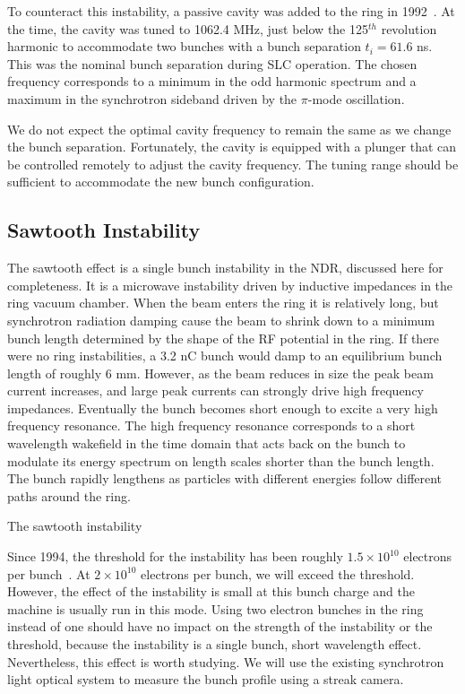 \documentclass[aps,prl,preprint,groupedaddress]{revtex4-1}
\begin{document}
To counteract this instability, a passive cavity was added to the ring in 1992~\cite{pi-cav}. At the time, the cavity was tuned to 1062.4 MHz, just below the 125$^{th}$ revolution harmonic to accommodate two bunches with a bunch separation $t_i = 61.6$ ns. This was the nominal bunch separation during SLC operation. The chosen frequency corresponds to a minimum in the odd harmonic spectrum and a maximum in the synchrotron sideband driven by the $\pi$-mode oscillation. 

We do not expect the optimal cavity frequency to remain the same as we change the bunch separation. Fortunately, the cavity is equipped with a plunger that can be controlled remotely to adjust the cavity frequency. The tuning range should be sufficient to accommodate the new bunch configuration.

\subsection{Sawtooth Instability}
The sawtooth effect is a single bunch instability in the NDR, discussed here for completeness. It is a microwave instability driven by inductive impedances in the ring vacuum chamber. When the beam enters the ring it is relatively long, but synchrotron radiation damping cause the beam to shrink down to a minimum bunch length determined by the shape of the RF potential in the ring. If there were no ring instabilities, a 3.2 nC bunch would damp to an equilibrium bunch length of roughly 6 mm. However, as the beam reduces in size the peak beam current increases, and large peak currents can strongly drive high frequency impedances. Eventually the bunch becomes short enough to excite a very high frequency resonance. The high frequency resonance corresponds to a short wavelength wakefield in the time domain that acts back on the bunch to modulate its energy spectrum on length scales shorter than the bunch length. The bunch rapidly lengthens as particles with different energies follow different paths around the ring. 

The sawtooth instability 

Since 1994, the threshold for the instability has been roughly $1.5 \times 10^{10}$ electrons per bunch~\cite{sawtooth}. At $2 \times 10^{10}$ electrons per bunch, we will exceed the threshold. However, the effect of the instability is small at this bunch charge and the machine is usually run in this mode. Using two electron bunches in the ring instead of one should have no impact on the strength of the instability or the threshold, because the instability is a single bunch, short wavelength effect. Nevertheless, this effect is worth studying. We will use the existing synchrotron light optical system to measure the bunch profile using a streak camera.
\end{document}
